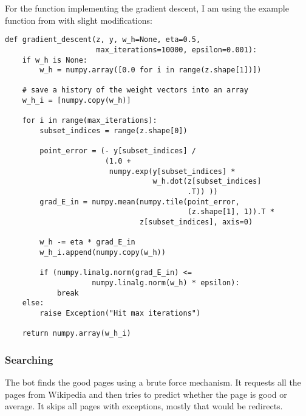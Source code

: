 For the function implementing the gradient descent, I am using the example
function from \cite{website:logistic-regression} with slight modifications:
\begin{verbatim}
def gradient_descent(z, y, w_h=None, eta=0.5,
                     max_iterations=10000, epsilon=0.001):
    if w_h is None:
        w_h = numpy.array([0.0 for i in range(z.shape[1])])

    # save a history of the weight vectors into an array
    w_h_i = [numpy.copy(w_h)]

    for i in range(max_iterations):
        subset_indices = range(z.shape[0])

        point_error = (- y[subset_indices] /
                       (1.0 +
                        numpy.exp(y[subset_indices] *
                                  w_h.dot(z[subset_indices]
                                          .T)) ))
        grad_E_in = numpy.mean(numpy.tile(point_error,
                                          (z.shape[1], 1)).T *
                               z[subset_indices], axis=0)

        w_h -= eta * grad_E_in
        w_h_i.append(numpy.copy(w_h))

        if (numpy.linalg.norm(grad_E_in) <=
                    numpy.linalg.norm(w_h) * epsilon):
            break
    else:
        raise Exception("Hit max iterations")

    return numpy.array(w_h_i)
\end{verbatim}

\subsubsection{Searching}

The bot finds the good pages using a brute force mechanism. It requests all the
pages from Wikipedia and then tries to predict whether the page is good or
average. It skips all pages with exceptions, mostly that would be redirects.
